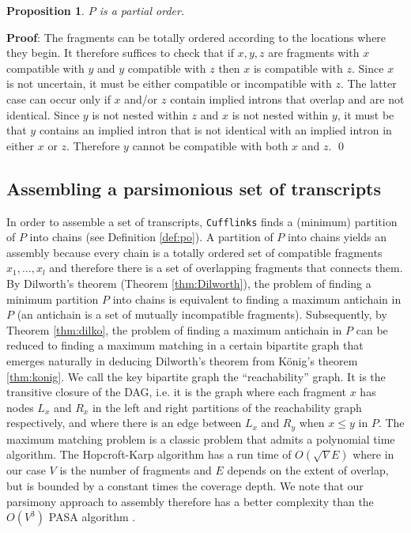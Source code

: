 \documentclass[12pt]{amsart}
\newtheorem{prop}[thm]{Proposition}
\theoremstyle{definition}
\begin{document}
\begin{prop}
$P$ is a partial order.
\end{prop}
{\bf Proof}: The fragments can be totally ordered according to the locations where they begin. It therefore suffices to check that if $x,y,z$ are fragments with $x$ compatible with $y$ and $y$ compatible with $z$ then $x$ is compatible with $z$. Since $x$ is not uncertain, it must be either compatible or incompatible with $z$. The latter case can occur only if $x$ and/or $z$ contain implied introns that overlap and are not identical. Since $y$ is not nested within $z$ and $x$ is not nested within $y$, it must be that $y$ contains an implied intron that is not identical with an implied intron in either $x$ or $z$. Therefore $y$ cannot be compatible with both $x$ and $z$. \qed

\subsection{Assembling a parsimonious set of transcripts}

In order to assemble a set of transcripts, {\tt Cufflinks} finds a
(minimum) partition of $P$ into chains (see Definition
\ref{def:po}). A partition of $P$ into chains yields an assembly
because every chain is a totally ordered set of compatible fragments
$x_1,\ldots,x_l$ and therefore there is a set of overlapping fragments
that connects them. By Dilworth's theorem (Theorem \ref{thm:Dilworth}), the problem of finding a minimum partition $P$ into chains is equivalent to finding a maximum antichain in $P$ (an antichain is a set of mutually incompatible fragments). Subsequently, by Theorem \ref{thm:dilko}, the problem of finding a maximum antichain in $P$ can be reduced to finding a maximum matching in a certain bipartite graph that emerges naturally in deducing Dilworth's theorem from K\"{o}nig's theorem \ref{thm:konig}. 
We call the key bipartite graph the ``reachability'' graph. It is the transitive closure of the DAG, i.e. it is the graph 
where each fragment $x$ has nodes $L_x$ and $R_x$ in the left and
right partitions of the reachability graph respectively, and where there is an edge between $L_x$ and $R_y$ when $x \leq y$ in $P$. The maximum matching problem is a classic problem that admits a polynomial time algorithm. The Hopcroft-Karp algorithm \cite{Hopcroft1973} has a run time of $O(\sqrt{V}E)$ where in our case $V$ is the number of fragments and $E$ depends on the extent of overlap, but is bounded by a constant times the coverage depth. We note that our parsimony approach to assembly therefore has a better complexity than the $O(V^3)$ PASA algorithm \cite{Haas2003}. 
\end{document}
